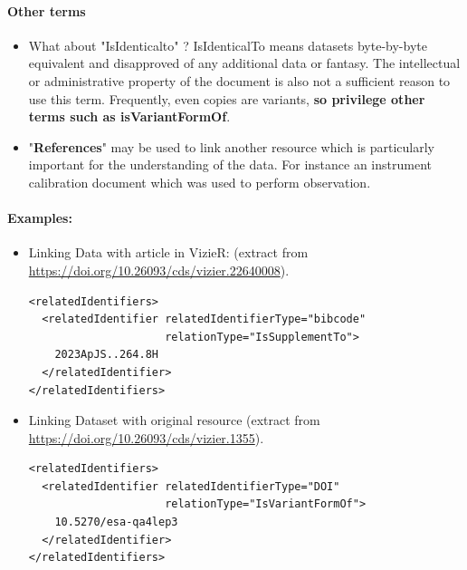 \documentclass[11pt,a4paper]{ivoa}
\begin{document}
\paragraph{Other terms}
\begin{itemize}
	\item What about "IsIdenticalto" ?\newline
IsIdenticalTo means datasets byte-by-byte equivalent and disapproved of any additional data or fantasy. The intellectual or administrative property of the document is also not a sufficient reason to use this term.\newline
Frequently, even copies are variants, \textbf{so privilege other terms such as isVariantFormOf}.

\item "\textbf{References}" may be used to link another resource which is  particularly important for the  understanding of the data. For instance an instrument calibration document which was used to perform observation.

\end{itemize}

\paragraph{Examples:}
\begin{itemize}
	\item Linking Data with article in VizieR:\newline
(extract from \url{https://doi.org/10.26093/cds/vizier.22640008}).

\begin{lstlisting}
<relatedIdentifiers>
  <relatedIdentifier relatedIdentifierType="bibcode" 
                     relationType="IsSupplementTo">
   	2023ApJS..264.8H
  </relatedIdentifier>
</relatedIdentifiers>
\end{lstlisting}

\item Linking Dataset with original resource\newline
(extract from \url{https://doi.org/10.26093/cds/vizier.1355}).
\begin{lstlisting}
<relatedIdentifiers>
  <relatedIdentifier relatedIdentifierType="DOI" 
                     relationType="IsVariantFormOf">
    10.5270/esa-qa4lep3
  </relatedIdentifier>
</relatedIdentifiers>
\end{lstlisting}

\end{itemize}
\end{document}
